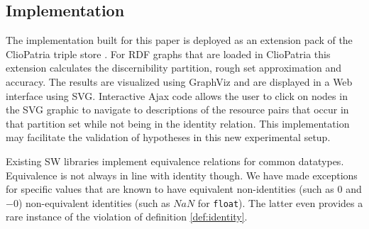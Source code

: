 \subsection{Implementation}
\label{sec:implementation}

The implementation built for this paper is deployed as an extension pack
  of the ClioPatria triple store \cite{schreiber_2006}.
For RDF graphs that are loaded in ClioPatria this extension calculates
  the discernibility partition, rough set approximation and accuracy.
The results are visualized using GraphViz and are displayed in a
  Web interface using SVG.
Interactive Ajax code allows the user to click on nodes in the SVG graphic
  to navigate to descriptions of the resource pairs that occur in
  that partition set while not being in the identity relation.
This implementation may facilitate the validation of hypotheses in this
  new experimental setup.

Existing SW libraries implement equivalence relations for common datatypes.
Equivalence is not always in line with identity though.
We have made exceptions for specific values that are known to have
  equivalent non-identities (such as $0$ and $-0$)
  non-equivalent identities (such as $NaN$ for \texttt{float}).\cite{XSD11}
The latter even provides a rare instance of the violation of
  definition \ref{def:identity}.


